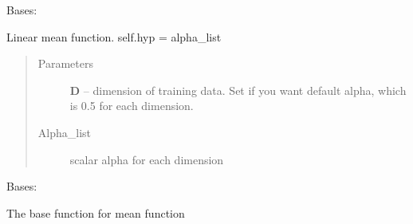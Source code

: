 \documentclass[letterpaper,10pt,english]{sphinxmanual}
\begin{document}

\begin{fulllineitems}
\label{pyGPs.Core:pyGPs.Core.mean.Linear}
Bases: {\hyperref[pyGPs.Core:pyGPs.Core.mean.Mean]{}}

Linear mean function. self.hyp = alpha\_list
\begin{quote}\begin{description}
\item[{Parameters}] \leavevmode
\textbf{D} -- dimension of training data. Set if you want default alpha, which is 0.5 for each dimension.

\item[{Alpha\_list }] \leavevmode
scalar alpha for each dimension

\end{description}\end{quote}

\begin{fulllineitems}
\label{pyGPs.Core:pyGPs.Core.mean.Linear.getDerMatrix}
\end{fulllineitems}


\begin{fulllineitems}
\label{pyGPs.Core:pyGPs.Core.mean.Linear.getMean}
\end{fulllineitems}


\end{fulllineitems}


\begin{fulllineitems}
\label{pyGPs.Core:pyGPs.Core.mean.Mean}
Bases: 

The base function for mean function

\end{fulllineitems}

\end{document}
